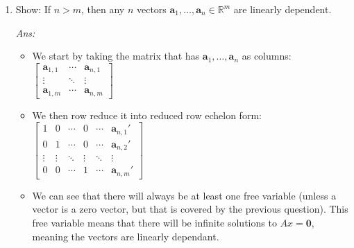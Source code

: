 \documentclass[12pt]{amsart}
\newcommand{\ba}{\mathbf{a}}
\newcommand{\bo}{\mathbf{0}}
\newcommand{\bv}{\mathbf v}
\newcommand{\R}{\mathbb{R}}
\newcommand\sol[1]{
\medskip
\begin{mdframed}
\emph{Ans:\\} #1
\end{mdframed}
\medskip
}
\DeclareMathOperator{\Span}{Span}
\begin{document}
\begin{enumerate}
\item Show: If $n>m$, then any $n$ vectors $\ba_1,\dots,\ba_n\in\R^m$ are linearly dependent. 

\sol{
  \begin{itemize}
    \item We start by taking the matrix that has $\ba_1,\dots,\ba_n$ as columns:\\
      $\left[\begin{matrix} \ba_{1,1} & \cdots & \ba_{n,1} \\ \vdots & \ddots & \vdots \\ \ba_{1,m} & \cdots & \ba_{n,m} \end{matrix}\right]$
    \item We then row reduce it into reduced row echelon form:\\
      $\left[\begin{matrix} 1 & 0 & \cdots & 0 & \cdots & \ba_{n,1}' \\ 
                            0 & 1 & \cdots & 0 & \cdots & \ba_{n,2}' \\
                            \vdots & \vdots & \ddots & \vdots & \ddots & \vdots\\
                            0 & 0 & \cdots & 1 & \cdots & \ba_{n,m}'
                            \end{matrix}\right]$
    \item We can see that there will always be at least one free variable (unless a vector is a zero vector, but that is covered by the previous question). This free variable means that there will be infinite solutions to $Ax=\bo$, meaning the vectors are linearly dependant.
  \end{itemize}
}





\end{enumerate}
\end{document}
